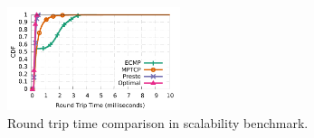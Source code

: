 \begin{figure}[t]
        \centering
  \includegraphics[width=0.45\textwidth]{presto/figures/scalability_test/scalability_compare_latency.pdf}
        \caption{Round trip time comparison in scalability benchmark. 
		}
        \label{micro_scalability_test_latency}
\end{figure}



